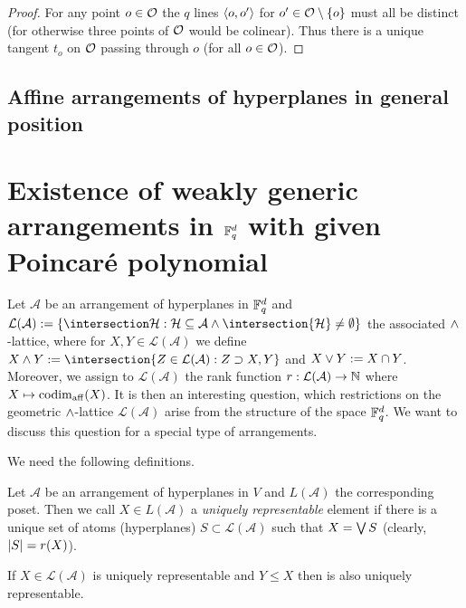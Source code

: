 \documentclass[a4paper]{article}
\begin{document}
\begin{proof}
    For any point $o\in\mathcal{O}$ the $q$ lines $\gen{o,o'}$ for $o'\in\mathcal{O}\setminus\{o\}$ must all be distinct (for otherwise three points of $\mathcal{O}$ would be colinear). Thus there is a unique tangent $t_o$ on $\mathcal{O}$ passing through $o$ (for all $o\in\mathcal{O}$). 
\end{proof}

\subsection{Affine arrangements of hyperplanes in general position}

\section{Existence of weakly generic arrangements in $\mathbb{F}_{q}^d$ with given Poincaré polynomial}

Let $\mathcal{A}$ be an arrangement of hyperplanes in $\mathbb{F}_{q}^d$ and $\mathcal{L}(\mathcal{A}):=\{\intersection \mathcal{H} : \mathcal{H}\subseteq \mathcal{A} \lgand \intersection{\mathcal{H}}\neq \emptyset\}$ the associated $\wedge$-lattice, where for $X,Y\in\mathcal{L}(\mathcal{A})$ we define $X\meet Y:=\intersection\{Z\in\mathcal{L}(\mathcal{A}):Z\supset X,Y\}$ and $X\vee Y:= X\cap Y$.
Moreover, we assign to $\mathcal{L}(\mathcal{A})$ the rank function $r:\mathcal{L(\mathcal{A})}\rightarrow \mathbb{N}$ where $X\mapsto \mathop\mathrm{codim}_{\mathop\mathrm{aff}}(X)$.
It is then an interesting question, which restrictions on the geometric $\wedge$-lattice $\mathcal{L}(\mathcal{A})$ arise from the structure of the space $\mathbb{F}_{q}^d$. We want to discuss this question for a special type of arrangements.

We need the following definitions.

\begin{definition} 
    Let $\mathcal{A}$ be an arrangement of hyperplanes in $V$ and $L(\mathcal{A})$ the corresponding poset. Then we call $X\in L(\mathcal{A})$ a \emph{uniquely representable} element if there is a unique set of atoms (hyperplanes) $S\subset\mathcal{L}(\mathcal{A})$ such that $X=\mathop\mathrm{\bigvee} {S}$ (clearly, $\left|S\right|=r(X)$).
\end{definition}

\begin{remark}
    If $X\in\mathcal{L}(\mathcal{A})$ is uniquely representable and $Y\leq X$ then is also uniquely representable. 
\end{remark}
\end{document}
